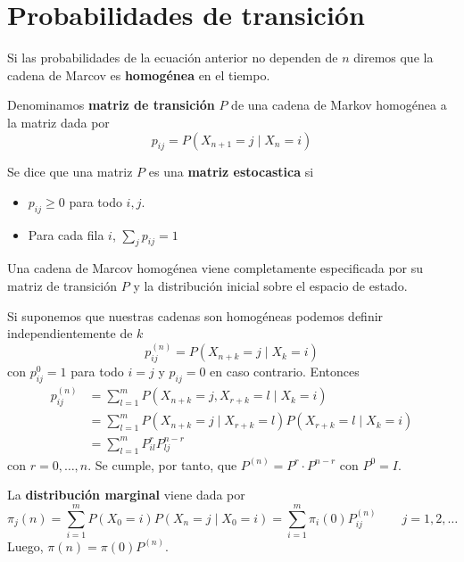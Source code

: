\documentclass[PREyA.tex]{subfiles}
\begin{document}
\section{Probabilidades de transición}
\begin{defi}
Si las probabilidades de la ecuación anterior no dependen de $n$ diremos que la cadena de Marcov es \textbf{homogénea} en el tiempo.
\end{defi}
\begin{defi}
Denominamos \textbf{matriz de transición} $P$ de una cadena de Markov homogénea a la matriz dada por
$$
p_{ij} = P(X_{n+1}=j\mid X_{n}=i) 
$$
\end{defi}
\begin{defi}
Se dice que una matriz $P$ es una \textbf{matriz estocastica} si
	
	\begin{itemize}
		\item $p_{ij} \geq 0$ para todo $i,j$.
		\item Para cada fila $i$, $\sum_{j} p_{ij} =1$
	\end{itemize}
	
\end{defi}
\begin{prop}
Una cadena de Marcov homogénea viene completamente especificada por su matriz de transición $P$ y la distribución inicial sobre el espacio de estado.
\end{prop}
\begin{nota}
Si suponemos que nuestras cadenas son homogéneas podemos definir independientemente de $k$
$$p_{ij}^{(n)} = P(X_{n+k}=j\mid X_{k}=i)$$
 con $p_{ij}^{0}=1$ para todo $i = j$ y $p_{ij}=0$ en caso contrario. Entonces
\begin{align*}
p_{ij}^{(n)} &= \sum_{l=1}^{m}P(X_{n+k}=j, X_{r+k}=l\mid X_{k}=i)\\
&= \sum_{l=1}^{m} P(X_{n+k}=j\mid X_{r+k}=l)P(X_{r+k}=l\mid X_{k}=i)\\
&= \sum_{l=1}^{m}P_{il}^{r} P_{lj}^{n-r}
\end{align*}
con $r=0,\dotsc,n$. Se cumple, por tanto, que ${P}^{(n)} = {P}^{r} \cdot {P}^{n-r}$ con ${P}^{0}=I$.

\end{nota}
\begin{defi}
La \textbf{distribución marginal} viene dada por 
\begin{equation*}
\pi_{j}(n) = \sum_{i=1}^{m} P(X_{0}=i)P(X_{n}=j\mid X_{0}=i)=\sum_{i=1}^{m} \pi_{i}(0) P_{ij}^{(n)} \qquad  j=1,2,\dotsc 
\end{equation*}
Luego, $\pi(n)=\pi(0) P^{(n)}$.
\end{defi}
\end{document}
